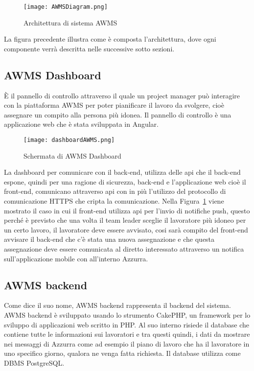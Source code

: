  \begin{figure}[h]
 	\begin{center}
 		\texttt{[image: AWMSDiagram.png]}
 		\caption{Architettura di sistema AWMS}\label{fig:arch}
 	\end{center}
 \end{figure}
La figura precedente illustra come è composta l'architettura, dove ogni componente verrà descritta nelle successive sotto sezioni.
\begin{trivlist}
	\item \subsection{AWMS Dashboard}
	È il pannello di controllo attraverso il quale un project manager può interagire con la piattaforma AWMS per poter pianificare il lavoro da svolgere, cioè assegnare un compito alla persona più idonea. Il pannello di controllo è una applicazione web che è stata sviluppata in Angular.
	\begin{figure}[h] 
		\begin{center}
			\texttt{[image: dashboardAWMS.png]}
			\caption{Schermata di AWMS Dashboard}
		\end{center}
	\end{figure}
	 	La dashboard per comunicare con il back-end, utilizza delle \gls{api} che il back-end espone, quindi per una ragione di sicurezza, back-end e l'applicazione web cioè il front-end, comunicano attraverso \gls{api} con in più l'utilizzo del protocollo di comunicazione HTTPS che cripta la comunicazione. Nella Figura~\ref{fig:arch} viene mostrato il caso in cui il front-end utilizza \gls{api} per l'invio di notifiche push, questo perché è previsto che una volta il team leader sceglie il lavoratore più idoneo per un certo lavoro, il lavoratore deve essere avvisato, cosi sarà compito del front-end avvisare il back-end che c'è stata una nuova assegnazione e che questa assegnazione deve essere comunicata al diretto interessato attraverso un notifica sull'applicazione mobile con all'interno Azzurra.
	\item \subsection{AWMS backend}
	Come dice il suo nome, AWMS backend rappresenta il backend del sistema. AWMS backend è sviluppato usando lo strumento CakePHP, un framework per lo sviluppo di applicazioni web scritto in PHP. Al suo interno risiede il database che contiene tutte le informazioni sui lavoratori e tra questi quindi, i dati da mostrare nei messaggi di Azzurra come ad esempio il piano di lavoro che ha il lavoratore in uno specifico giorno, qualora ne venga fatta richiesta. Il database utilizza come DBMS PostgreSQL. \\

\end{trivlist}
